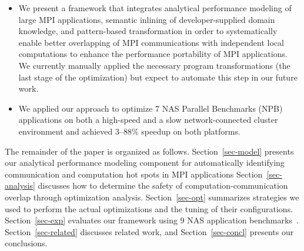 \begin{itemize}

\item We present a framework that integrates analytical performance
  modeling of large MPI applications, semantic inlining of
  developer-supplied domain knowledge, and pattern-based
  transformation in order to systematically enable better overlapping
  of MPI communications with independent local computations to enhance
  the performance portability of MPI applications. We currently
  manually applied the necessary program transformations (the last
  stage of the optimization) but expect to automate this step in our
  future work.

\item We applied our approach to optimize 7 NAS Parallel Benchmarks
  (NPB) applications on both a high-speed and a slow network-connected
  cluster environment and achieved 3--88\% speedup on both platforms.

\end{itemize}

The remainder of the paper is organized as follows.
Section~\ref{sec-model} presents our analytical performance modeling
component for automatically identifying communication and computation
hot spots in MPI applications Section~\ref{sec-analysis} discusses how
to determine the safety of computation-communication overlap through
optimization analysis.  Section~\ref{sec-opt} summarizes strategies we
used to perform the actual optimizations and the tuning of their
configurations.  Section~\ref{sec-exp} evaluates our framework using 9
NAS application benchmarks~\cite{npb}.  Section~\ref{sec-related}
discusses related work, and Section~\ref{sec-concl} presents our
conclusions.
